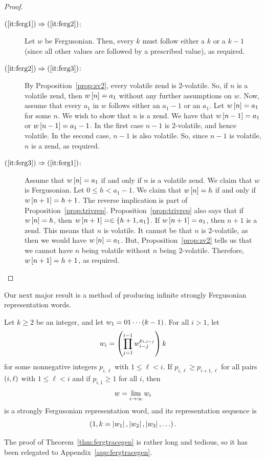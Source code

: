 \documentclass[english,12pt]{article}
\newcommand{\seq}{\p}
\begin{document}
\begin{proof}\lb
\begin{description}
\item[$\left(\ref{it:ferg1}\right)\Rightarrow\left(\ref{it:ferg2}\right)$:] Let $w$ be Fergusonian.  Then, every $k$ must follow either a $k$ or a $k-1$ (since all other values are followed by a prescribed value), as required.
\item[$\left(\ref{it:ferg2}\right)\Rightarrow\left(\ref{it:ferg3}\right)$:] By Proposition~\ref{prop:zv2}, every volatile zend is $2$-volatile.  So, if $n$ is a volatile zend, then $w\left[n\right]=a_1$ without any further assumptions on $w$.  Now, assume that every $a_1$ in $w$ follows either an $a_1-1$ or an $a_1$.  Let $w\left[n\right]=a_1$ for some $n$.  We wish to show that $n$ is a zend.  We have that $w\left[n-1\right]=a_1$ or $w\left[n-1\right]=a_1-1$.  In the first case $n-1$ is $2$-volatile, and hence volatile.  In the second case, $n-1$ is also volatile.  So, since $n-1$ is volatile, $n$ is a zend, as required.
\item[$\left(\ref{it:ferg3}\right)\Rightarrow\left(\ref{it:ferg1}\right)$:] Assume that $w\left[n\right]=a_1$ if and only if $n$ is a volatile zend.  We claim that $w$ is Fergusonian.  Let $0\leq h<a_1-1$.  We claim that $w\left[n\right]=h$ if and only if $w\left[n+1\right]=h+1$.  The reverse implication is part of Proposition~\ref{prop:trivrep}.  Proposition~\ref{prop:trivrep} also says that if $w\left[n\right]=h$, then $w\left[n+1\right]=\in\left\{h+1,a_1\right\}$.  If $w\left[n+1\right]=a_1$, then $n+1$ is a zend.  This means that $n$ is volatile.  It cannot be that $n$ is $2$-volatile, as then we would have $w\left[n\right]=a_1$.  But, Proposition~\ref{prop:zv2} tells us that we cannot have $n$ being volatile without $n$ being $2$-volatile.  Therefore, $w\left[n+1\right]=h+1$, as required.
\end{description}
\end{proof}
Our next major result is a method of producing infinite strongly Fergusonian representation words.
\begin{theorem}\label{thm:fergtracegen}
Let $k\geq2$ be an integer, and let $w_1=01\cdots\left(k-1\right)$.  For all $i>1$, let
\[
w_i=\left(\prod_{j=1}^{i-1}w_{i-j}^{p_{i,i-j}}\right)k
\]
for some nonnegative integers $p_{i,\ell}$ with $1\leq\ell<i$.  If $p_{i,\ell}\geq p_{i+1,\ell}$ for all pairs $\left(i, \ell\right)$ with $1\leq\ell<i$ and if $p_{i,1}\geq1$ for all $i$,
then
\[
w=\lim_{i\rightarrow\infty}{w_i}
\]
is a strongly Fergusonian representation word, and its representation sequence is
\[
\seq{1,k=\ab{w_1},\ab{w_2},\ab{w_3},\ldots}.
\]
\end{theorem}
The proof of Theorem~\ref{thm:fergtracegen} is rather long and tedious, so it has been relegated to Appendix~\ref{app:fergtracegen}.
\end{document}
